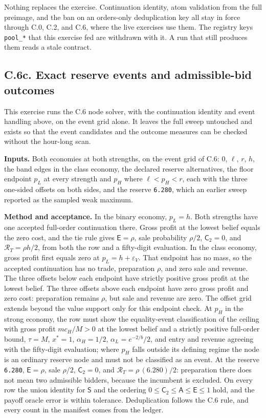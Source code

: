 \documentclass[
  11pt,
]{article}
\begin{document}
Nothing replaces the exercise. Continuation identity, atom validation from the
full preimage, and the ban on an orders-only deduplication key all stay in force
through C.0, C.2, and C.6, where the live exercises use them.
The registry keys \texttt{pool\_*} that this exercise fed are withdrawn with it.
A run that still produces them reads a stale contract.

\subsection{C.6c. Exact reserve events and admissible-bid
outcomes}\label{oa-c-reserve-events}

This exercise runs the C.6 node solver, with the continuation identity
and event handling above, on the event grid alone. It leaves the full
sweep untouched and exists so that the event candidates and the outcome
measures can be checked without the hour-long scan.

\textbf{Inputs.} Both economies at both strengths, on the event grid of
C.6: \(0\), \(\ell\), \(r\), \(h\), the band edges in the class economy,
the declared reserve alternatives, the floor endpoint \(p_L\) at every
strength and \(p_H\) where \(\ell<p_H<r\), each with the three one-sided
offsets on both sides, and the reserve \texttt{6.280}, which an earlier
sweep reported as the sampled weak maximum.

\textbf{Method and acceptance.} In the binary economy, \(p_L=h\). Both
strengths have one accepted full-order continuation there. Gross profit
at the lowest belief equals the zero cost, and the tie rule gives
\(\mathsf E=\rho\), sale probability \(\rho/2\), \(\mathsf C_2=0\), and
\(\mathcal R_T=\rho h/2\), from both the row and a fifty-digit
evaluation. In the class economy, gross profit first equals zero at
\(p_L=h+\varepsilon_V\). That endpoint has no mass, so the accepted
continuation has no trade, preparation \(\rho\), and zero sale and
revenue. The three offsets below each endpoint have strictly positive
gross profit at the lowest belief. The three offsets above each endpoint
have zero gross profit and zero cost: preparation remains \(\rho\), but
sale and revenue are zero. The offset grid extends beyond the value
support only for this endpoint check. At \(p_H\) in the strong economy,
the row must show the equality-event classification of the ceiling with
gross profit \(mc_H/M>0\) at the lowest belief and a strictly positive
full-order bound, \(\tau=M\), \(x^*=1\), \(\alpha_H=1/2\),
\(\alpha_L=e^{-2/b}/2\), and entry and revenue agreeing with the
fifty-digit evaluation; where \(p_H\) falls outside its defining regime
the node is an ordinary reserve node and must not be classified as an
event. At the reserve \texttt{6.280}, \(\mathsf E=\rho\), sale
\(\rho/2\), \(\mathsf C_2=0\), and \(\mathcal R_T=\rho\,(6.280)/2\):
preparation there does not mean two admissible bidders, because the
incumbent is excluded. On every row the union identity for \(\mathsf S\)
and the ordering \(0\le\mathsf C_2\le\mathsf A\le\mathsf E\le1\) hold,
and the payoff oracle error is within tolerance. Deduplication follows
the C.6 rule, and every count in the manifest comes from the ledger.
\end{document}
